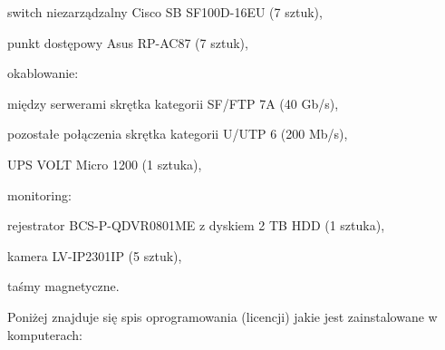 \begin{minipage}{13.5cm}
\begin{itemize*}
	\item switch niezarządzalny Cisco SB SF100D-16EU (7 sztuk),
	\item punkt dostępowy Asus RP-AC87 (7 sztuk),
	\item okablowanie:
	\begin{itemize*}
		\item między serwerami skrętka kategorii SF/FTP 7A (40 Gb/s),
		\item pozostałe połączenia skrętka  kategorii U/UTP 6 (200 Mb/s),
	\end{itemize*}
	\item UPS VOLT Micro 1200 (1 sztuka),
	\item monitoring:
	\begin{itemize*}
		\item rejestrator BCS-P-QDVR0801ME z dyskiem 2 TB HDD (1 sztuka),
		\item kamera LV-IP2301IP (5 sztuk),
	\end{itemize*}
	\item taśmy magnetyczne.
\end{itemize*}
\end{minipage}

\newpage
Poniżej znajduje się spis oprogramowania (licencji) jakie jest \linebreak zainstalowane w komputerach:

